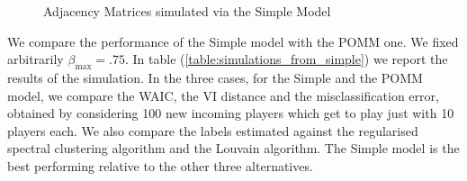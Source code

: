 \documentclass[11pt]{amsart}
\begin{document}
\begin{figure}[htbp]
    \centering
    \hfill
    \hfill
    \caption{Adjacency Matrices simulated via the Simple Model}
    \label{fig:simple_adjacency}
\end{figure}

We compare the performance of the Simple model with the POMM one. We fixed arbitrarily $\beta_{\max} = .75$.
In table (\ref{table:simulations_from_simple}) we report the results of the simulation. In the three cases, for the Simple and the POMM model, we compare the WAIC, the VI distance and the misclassification error, obtained by considering 100 new incoming players which get to play just with 10 players each. We also compare the labels estimated against the regularised spectral clustering algorithm and the Louvain algorithm. The Simple model is the best performing relative to the other three alternatives.
\end{document}
